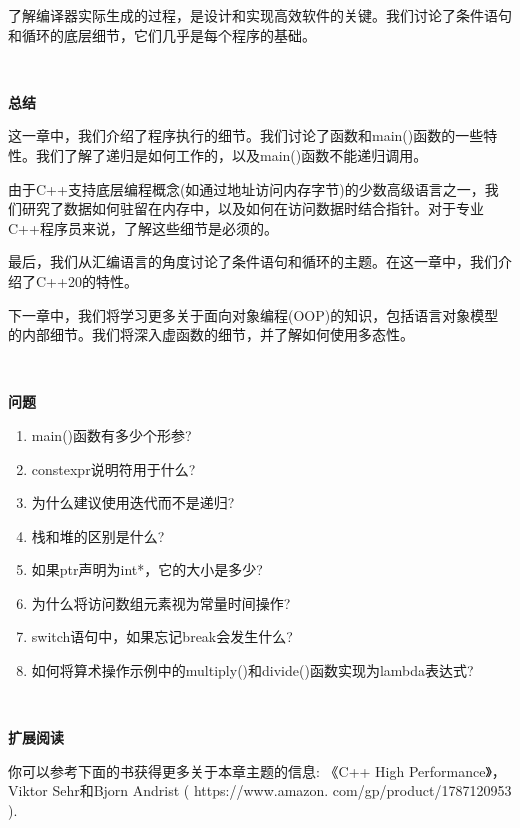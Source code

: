 了解编译器实际生成的过程，是设计和实现高效软件的关键。我们讨论了条件语句和循环的底层细节，它们几乎是每个程序的基础。 \par

\noindent\textbf{}\ \par
\textbf{总结} \ \par
这一章中，我们介绍了程序执行的细节。我们讨论了函数和main()函数的一些特性。我们了解了递归是如何工作的，以及main()函数不能递归调用。 \par
由于C++支持底层编程概念(如通过地址访问内存字节)的少数高级语言之一，我们研究了数据如何驻留在内存中，以及如何在访问数据时结合指针。对于专业C++程序员来说，了解这些细节是必须的。 \par
最后，我们从汇编语言的角度讨论了条件语句和循环的主题。在这一章中，我们介绍了C++20的特性。 \par
下一章中，我们将学习更多关于面向对象编程(OOP)的知识，包括语言对象模型的内部细节。我们将深入虚函数的细节，并了解如何使用多态性。 \par

\noindent\textbf{}\ \par
\textbf{问题} \ \par
\begin{enumerate}
	\item main()函数有多少个形参?
	\item constexpr说明符用于什么?
	\item 为什么建议使用迭代而不是递归?
	\item 栈和堆的区别是什么?
	\item 如果ptr声明为int*，它的大小是多少? 
	\item 为什么将访问数组元素视为常量时间操作?
	\item switch语句中，如果忘记break会发生什么?
	\item 如何将算术操作示例中的multiply()和divide()函数实现为lambda表达式?
\end{enumerate}

\noindent\textbf{}\ \par
\textbf{扩展阅读} \ \par
你可以参考下面的书获得更多关于本章主题的信息: 《C++ High Performance》，Viktor Sehr和Bjorn Andrist ( https:/​/​www.​amazon.
com/​gp/​product/​1787120953 ).\par

\newpage